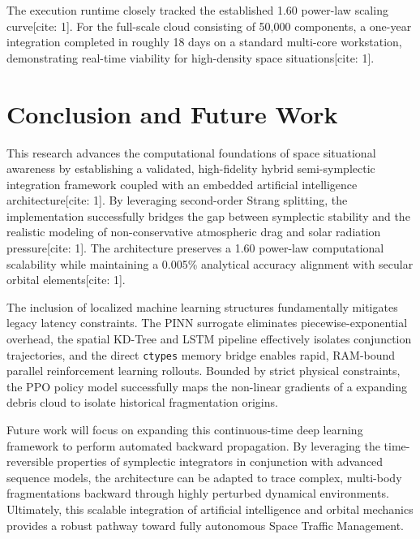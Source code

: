 \documentclass[conf]{AAS} %
\begin{document}
The execution runtime closely tracked the established 1.60 power-law scaling curve[cite: 1]. For the full-scale cloud consisting of 50,000 components, a one-year integration completed in roughly 18 days on a standard multi-core workstation, demonstrating real-time viability for high-density space situations[cite: 1].

\section{Conclusion and Future Work}
\label{sec:conclusion_and_future_work}

This research advances the computational foundations of space situational awareness by establishing a validated, high-fidelity hybrid semi-symplectic integration framework coupled with an embedded artificial intelligence architecture[cite: 1]. By leveraging second-order Strang splitting, the implementation successfully bridges the gap between symplectic stability and the realistic modeling of non-conservative atmospheric drag and solar radiation pressure[cite: 1]. The architecture preserves a 1.60 power-law computational scalability while maintaining a 0.005\% analytical accuracy alignment with secular orbital elements[cite: 1].

The inclusion of localized machine learning structures fundamentally mitigates legacy latency constraints. The PINN surrogate eliminates piecewise-exponential overhead, the spatial KD-Tree and LSTM pipeline effectively isolates conjunction trajectories, and the direct \texttt{ctypes} memory bridge enables rapid, RAM-bound parallel reinforcement learning rollouts. Bounded by strict physical constraints, the PPO policy model successfully maps the non-linear gradients of a expanding debris cloud to isolate historical fragmentation origins.

Future work will focus on expanding this continuous-time deep learning framework to perform automated backward propagation. By leveraging the time-reversible properties of symplectic integrators in conjunction with advanced sequence models, the architecture can be adapted to trace complex, multi-body fragmentations backward through highly perturbed dynamical environments. Ultimately, this scalable integration of artificial intelligence and orbital mechanics provides a robust pathway toward fully autonomous Space Traffic Management.
\end{document}
